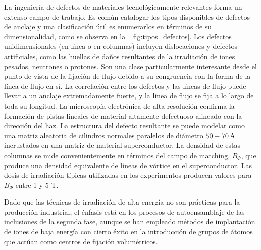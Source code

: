 \documentclass[a4paper,conference]{IEEEtran}
\begin{document}
La ingenier\'{i}a de defectos de materiales tecnol\'{o}gicamente relevantes
forma un extenso campo de trabajo. Es com\'{u}n catalogar los tipos disponibles
de defectos de anclaje y una clasificaci\'{o}n \'{u}til es enumerarlos en
t\'{e}rminos de su dimensionalidad, como se observa en la
\figurename~\ref{fig:tipos_defectos}. Los defectos unidimensionales (en
l\'{i}nea o en columnas) incluyen dislocaciones y defectos artificiales, como
las huellas de da\~{n}os resultantes de la irradiaci\'{o}n de iones pesados,
neutrones o protones. Son una clase particularmente interesante desde el punto
de vista de la fijaci\'{o}n de flujo debido a su congruencia con la forma de la
l\'{i}nea de flujo en s\'{i}. La correlaci\'{o}n entre los defectos y las
l\'{i}neas de flujo puede llevar a un anclaje extremadamente fuerte, y la
l\'{i}nea de flujo se fija a lo largo de toda su longitud.  La microscop\'{i}a
electr\'{o}nica de alta resoluci\'{o}n confirma la formaci\'{o}n de pistas
lineales de material altamente defectuoso alineado con la direcci\'{o}n del haz.
La estructura del defecto resultante se puede modelar como una matriz aleatoria
de cilindros normales paralelos de di\'{a}metro $50 - 70\,\textup{\r{A}}$
incrustados en una matriz de material superconductor. La densidad de estas
columnas se mide convenientemente en t\'{e}rminos del campo de matching, $
B_\Phi $, que produce una densidad equivalente de l\'{i}neas de v\'{o}rtice en
el superconductor. Las dosis de irradiaci\'{o}n t\'{i}picas utilizadas en los
experimentos producen valores para $ B_ \Phi $ entre 1 y 5 T.


Dado que las t\'{e}cnicas de irradiaci\'{o}n de alta energ\'{i}a
no son pr\'{a}cticas para la producci\'{o}n industrial, el \'{e}nfasis est\'{a}
en los procesos de autoensamblaje de las inclusiones de la segunda fase, aunque
se han empleado m\'{e}todos de implantaci\'{o}n de iones de baja energ\'{i}a con
cierto \'{e}xito en la introducci\'{o}n de grupos de \'{a}tomos que act\'{u}an
como centros de fijaci\'{o}n volum\'{e}tricos.
\end{document}
